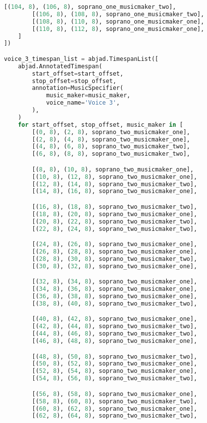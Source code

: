 \begin{lstlisting}[language=Python, caption=Invocation Source Code]
        [(104, 8), (106, 8), soprano_one_musicmaker_two],
        [(106, 8), (108, 8), soprano_one_musicmaker_two],
        [(108, 8), (110, 8), soprano_one_musicmaker_one],
        [(110, 8), (112, 8), soprano_one_musicmaker_one],
    ]
])

voice_3_timespan_list = abjad.TimespanList([
    abjad.AnnotatedTimespan(
        start_offset=start_offset,
        stop_offset=stop_offset,
        annotation=MusicSpecifier(
            music_maker=music_maker,
            voice_name='Voice 3',
        ),
    )
    for start_offset, stop_offset, music_maker in [
        [(0, 8), (2, 8), soprano_two_musicmaker_one],
        [(2, 8), (4, 8), soprano_two_musicmaker_one],
        [(4, 8), (6, 8), soprano_two_musicmaker_two],
        [(6, 8), (8, 8), soprano_two_musicmaker_two],

        [(8, 8), (10, 8), soprano_two_musicmaker_one],
        [(10, 8), (12, 8), soprano_two_musicmaker_one],
        [(12, 8), (14, 8), soprano_two_musicmaker_two],
        [(14, 8), (16, 8), soprano_two_musicmaker_one],

        [(16, 8), (18, 8), soprano_two_musicmaker_two],
        [(18, 8), (20, 8), soprano_two_musicmaker_one],
        [(20, 8), (22, 8), soprano_two_musicmaker_two],
        [(22, 8), (24, 8), soprano_two_musicmaker_two],

        [(24, 8), (26, 8), soprano_two_musicmaker_one],
        [(26, 8), (28, 8), soprano_two_musicmaker_one],
        [(28, 8), (30, 8), soprano_two_musicmaker_two],
        [(30, 8), (32, 8), soprano_two_musicmaker_one],

        [(32, 8), (34, 8), soprano_two_musicmaker_one],
        [(34, 8), (36, 8), soprano_two_musicmaker_one],
        [(36, 8), (38, 8), soprano_two_musicmaker_one],
        [(38, 8), (40, 8), soprano_two_musicmaker_two],

        [(40, 8), (42, 8), soprano_two_musicmaker_one],
        [(42, 8), (44, 8), soprano_two_musicmaker_two],
        [(44, 8), (46, 8), soprano_two_musicmaker_two],
        [(46, 8), (48, 8), soprano_two_musicmaker_one],

        [(48, 8), (50, 8), soprano_two_musicmaker_two],
        [(50, 8), (52, 8), soprano_two_musicmaker_one],
        [(52, 8), (54, 8), soprano_two_musicmaker_one],
        [(54, 8), (56, 8), soprano_two_musicmaker_two],

        [(56, 8), (58, 8), soprano_two_musicmaker_one],
        [(58, 8), (60, 8), soprano_two_musicmaker_two],
        [(60, 8), (62, 8), soprano_two_musicmaker_one],
        [(62, 8), (64, 8), soprano_two_musicmaker_two],


\end{lstlisting}
